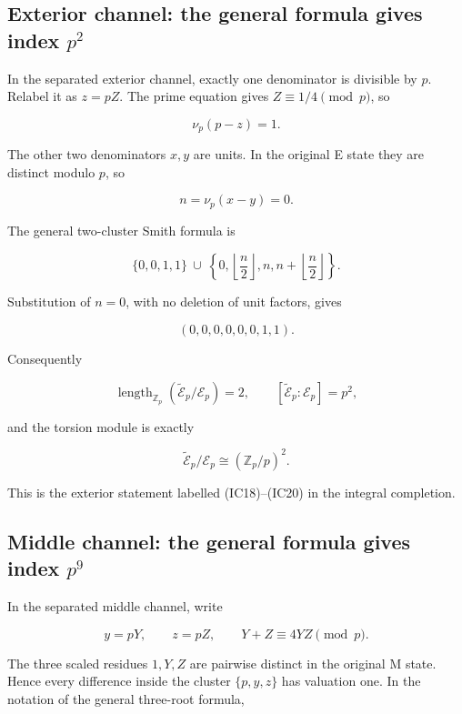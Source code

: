 \subsection{\texorpdfstring{Exterior channel: the general formula gives
index
\(p^2\)}{Exterior channel: the general formula gives index p\^{}2}}\label{exterior-channel-the-general-formula-gives-index-p2}

In the separated exterior channel, exactly one denominator is divisible
by \(p\). Relabel it as \(z=pZ\). The prime equation gives
\(Z\equiv1/4\pmod p\), so

\[
\nu_p(p-z)=1.
\]

The other two denominators \(x,y\) are units. In the original E state
they are distinct modulo \(p\), so

\[
n=\nu_p(x-y)=0.
\]

The general two-cluster Smith formula is

\[
\{0,0,1,1\}\ \cup\
\left\{0,\left\lfloor\frac n2\right\rfloor,
n,n+\left\lfloor\frac n2\right\rfloor\right\}.
\]

Substitution of \(n=0\), with no deletion of unit factors, gives

\[
\boxed{(0,0,0,0,0,0,1,1).}
\]

Consequently

\[
\operatorname{length}_{\mathbb Z_p}
(\widetilde{\mathscr E}_p/\mathscr E_p)=2,\qquad
[\widetilde{\mathscr E}_p:\mathscr E_p]=p^2,
\]

and the torsion module is exactly

\[
\widetilde{\mathscr E}_p/\mathscr E_p
\cong(\mathbb Z_p/p)^2.
\]

This is the exterior statement labelled (IC18)--(IC20) in the integral
completion.

\subsection{\texorpdfstring{Middle channel: the general formula gives
index
\(p^9\)}{Middle channel: the general formula gives index p\^{}9}}\label{middle-channel-the-general-formula-gives-index-p9}

In the separated middle channel, write

\[
y=pY,\qquad z=pZ,\qquad
Y+Z\equiv4YZ\pmod p.
\]

The three scaled residues \(1,Y,Z\) are pairwise distinct in the
original M state. Hence every difference inside the cluster
\(\{p,y,z\}\) has valuation one. In the notation of the general
three-root formula,

